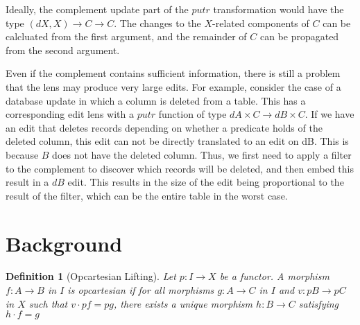 \documentclass[a4paper,10pt]{article}
\newtheorem{definition}{Definition}
\begin{document}
Ideally, the complement update part of the $putr$ transformation would
have the type $(dX, X) \to C \to C$. The changes to the $X$-related
components of $C$ can be calcluated from the first argument, and the
remainder of $C$ can be propagated from the second argument.
 

Even if the complement contains sufficient information, there is still
a problem that the lens may produce very large edits. For example,
consider the case of a database update in which a column is deleted
from a table. This has a corresponding edit lens with a $putr$
function of type $dA \times C \to dB \times C$. If we have an edit
that deletes records depending on whether a predicate holds of the
deleted column, this edit can not be directly translated to an edit on
dB. This is because $B$ does not have the deleted column. Thus, we
first need to apply a filter to the complement to discover which
records will be deleted, and then embed this result in a $dB$
edit. This results in the size of the edit being proportional to the
result of the filter, which can be the entire table in the worst case.



\section{Background}

\begin{definition}[Opcartesian Lifting] \label{opcartesian}
  Let $p : I \to X$ be a functor. A morphism $f : A \to B$ in $I$ is opcartesian if for all morphisms $g : A \to C$ in $I$ and $v : pB \to pC$ in $X$ such that $v \cdot pf = pg$, there exists a unique morphism $h : B \to C$ satisfying $h \cdot f = g$
\end{definition}
\end{document}
